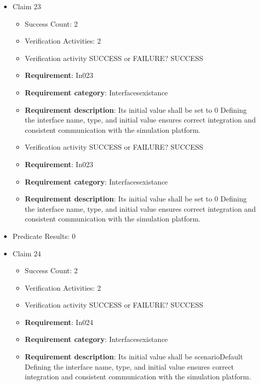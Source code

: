 \documentclass{article}
\begin{document}
\begin{itemize}
  				  \item Claim 23
				\begin{itemize}
			    	\item Success Count: 2 
			    	\item Verification Activities: 2
					\item Verification activity SUCCESS or FAILURE? SUCCESS
		
						\item \textbf{Requirement}: In023 
						\item \textbf{Requirement category}: Interfacesexistance 
						\item \textbf{Requirement description}: Its initial value shall be set to 0 Defining the interface name, type, and initial value ensures correct integration and consistent communication with the simulation platform.
					
					\item Verification activity SUCCESS or FAILURE? SUCCESS
		
						\item \textbf{Requirement}: In023 
						\item \textbf{Requirement category}: Interfacesexistance 
						\item \textbf{Requirement description}: Its initial value shall be set to 0 Defining the interface name, type, and initial value ensures correct integration and consistent communication with the simulation platform.
					
				\end{itemize}
				
									    
				\item Predicate Results: 0

  				  \item Claim 24
				\begin{itemize}
			    	\item Success Count: 2 
			    	\item Verification Activities: 2
					\item Verification activity SUCCESS or FAILURE? SUCCESS
		
						\item \textbf{Requirement}: In024 
						\item \textbf{Requirement category}: Interfacesexistance 
						\item \textbf{Requirement description}: Its initial value shall be scenarioDefault Defining the interface name, type, and initial value ensures correct integration and consistent communication with the simulation platform.
					

\end{itemize}
\end{itemize}
\end{document}
